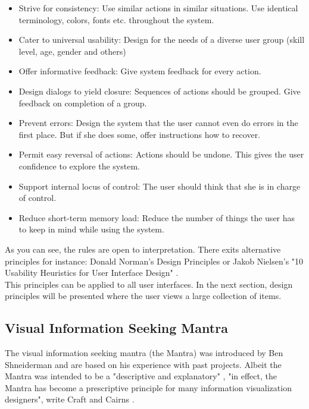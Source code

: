 \documentclass[11pt]{report}
\begin{document}
\begin{itemize}
	\item Strive for consistency: Use similar actions in similar situations. Use identical terminology, colors, fonts etc. throughout the system.	
	\item Cater to universal usability: Design for the needs of a diverse user group (skill level, age, gender and others)
	\item Offer informative feedback: Give system feedback for every action.
	\item Design dialogs to yield closure: Sequences of actions should be grouped. Give feedback on completion of a group.
	\item Prevent errors: Design the system that the user cannot even do errors in the first place. But if she does some, offer instructions how to recover.
	\item Permit easy reversal of actions: Actions should be undone. This gives the user confidence to explore the system.
	\item Support internal locus of control: The user should think that she is in charge of control.
	\item Reduce short-term memory load: Reduce the number of things the user has to keep in mind while using the system.
\end{itemize}

As you can see, the rules are open to interpretation. There exits alternative principles for instance: Donald Norman's Design Principles \cite{Norman2013} or Jakob Nielsen's "10 Usability Heuristics for User Interface Design" \cite{Nielsen1995}. \\

This principles can be applied to all user interfaces. In the next section, design principles will be presented where the user views a large collection of items.

\subsection{Visual Information Seeking Mantra}

The visual information seeking mantra (the Mantra) was introduced by Ben Shneiderman \cite{Shneiderman1996} and are based on his experience with past projects. Albeit the Mantra was intended to be a "descriptive and explanatory" \cite{Card1999}, "in effect, the Mantra has become a prescriptive principle for many information visualization designers", write Craft and Cairns \cite{Craft2005}. \\
\end{document}
